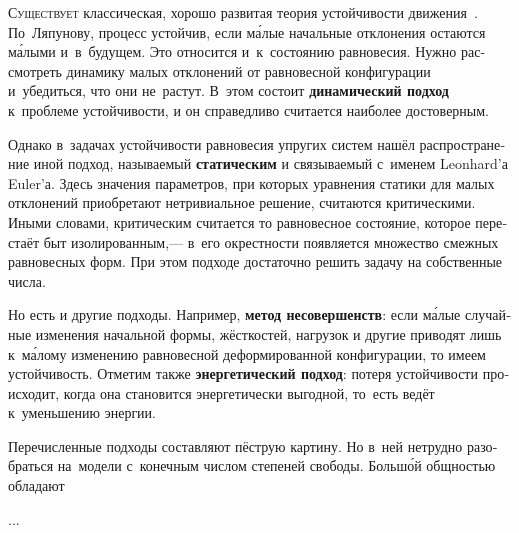 

\thispagestyle{empty}

\label{chapter:stability}



\begin{otherlanguage}{russian}

\lettrine[lines=2, findent=2pt, nindent=0pt]{С}{уществует} классическая, хорошо развитая теория устойчивости движения~\cite{merkin-stabilityintro}. По~Ляпунову, процесс устойчив, если м\'{а}лые начальные отклонения остаются м\'{а}лыми и~в~будущем. Это относится и~к~состоянию равновесия. Нужно рассмотреть динамику малых отклонений от равновесной конфигурации и~убедиться, что они не~растут. В~этом состоит \textbf{динамический подход} к~проблеме устойчивости, и он справедливо считается наиболее достоверным.

Однако в~задачах устойчивости равновесия упругих систем нашёл распространение иной подход, называемый \textbf{статическим} и связываемый с~именем Leonhard’а Euler’а. Здесь значения параметров, при которых уравнения статики для малых отклонений приобретают нетривиальное решение, считаются критическими. Иными словами, критическим считается то равновесное состояние, которое перестаёт быт изолированным,\:--- в~его окрестности появляется множество смежных равновесных форм. При этом подходе достаточно решить задачу на собственные числа.

Но есть и другие подходы. Например, \textbf{метод несовершенств}: если м\'{а}лые случайные изменения начальной формы, жёсткостей, нагрузок и другие приводят лишь к~м\'{а}лому изменению равновесной деформированной конфигурации, то имеем устойчивость. Отметим также \textbf{энергетический подход}: потеря устойчивости происходит, когда она становится энергетически выгодной, то~есть ведёт к~уменьшению энергии.

Перечисленные подходы составляют пёструю картину. Но в~ней нетрудно разобраться на~модели с~конечным числом степеней свободы. Больш\'{о}й общностью обладают

...



\end{otherlanguage}

